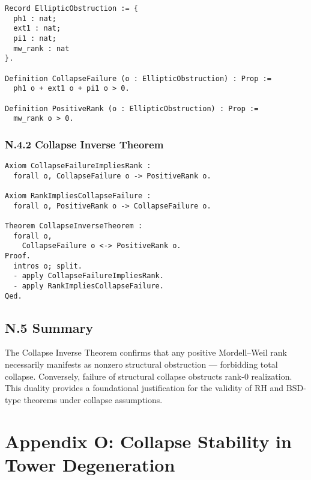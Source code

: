 \documentclass[11pt]{article}
\begin{document}
\begin{lstlisting}[language=Coq, caption=Collapse Failure ⇔ Arithmetic Rank, captionpos=b]
Record EllipticObstruction := {
  ph1 : nat;
  ext1 : nat;
  pi1 : nat;
  mw_rank : nat
}.

Definition CollapseFailure (o : EllipticObstruction) : Prop :=
  ph1 o + ext1 o + pi1 o > 0.

Definition PositiveRank (o : EllipticObstruction) : Prop :=
  mw_rank o > 0.
\end{lstlisting}

\subsubsection*{N.4.2 Collapse Inverse Theorem}

\begin{lstlisting}[language=Coq, caption=Collapse Inverse Theorem (Equivalence), captionpos=b]
Axiom CollapseFailureImpliesRank :
  forall o, CollapseFailure o -> PositiveRank o.

Axiom RankImpliesCollapseFailure :
  forall o, PositiveRank o -> CollapseFailure o.

Theorem CollapseInverseTheorem :
  forall o,
    CollapseFailure o <-> PositiveRank o.
Proof.
  intros o; split.
  - apply CollapseFailureImpliesRank.
  - apply RankImpliesCollapseFailure.
Qed.
\end{lstlisting}

\subsection*{N.5 Summary}

The Collapse Inverse Theorem confirms that any positive Mordell–Weil rank necessarily manifests as nonzero structural obstruction — forbidding total collapse. Conversely, failure of structural collapse obstructs rank-0 realization. This duality provides a foundational justification for the validity of RH and BSD-type theorems under collapse assumptions.



\appendix
\section*{Appendix O: Collapse Stability in Tower Degeneration}
\end{document}
